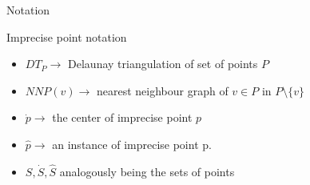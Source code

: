 \documentclass{beamer}
\begin{document}
\begin{frame}{Notation}
\begin{block}{Imprecise point notation}
\begin{itemize}
\item $DT_P \rightarrow $ Delaunay triangulation of set of points $P$
\item $NNP(v) \rightarrow $ nearest neighbour graph of $v \in P$ in $P \setminus \{v\}$
\item $\dot{p} \rightarrow $ the center of imprecise point $p$
\item $\hat{p} \rightarrow $ an instance of imprecise point p.
\item $S, \dot{S}, \hat{S} $ analogously being the sets of points 
\end{itemize}
\end{block}
\end{frame}
\end{document}
